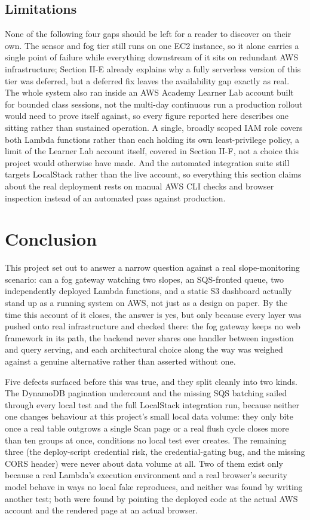 \documentclass[conference]{IEEEtran}
\begin{document}
\subsection{Limitations}
None of the following four gaps should be left for a reader to discover on their own. The sensor and fog tier still runs on one EC2 instance, so it alone carries a single point of failure while everything downstream of it sits on redundant AWS infrastructure; Section II-E already explains why a fully serverless version of this tier was deferred, but a deferred fix leaves the availability gap exactly as real. The whole system also ran inside an AWS Academy Learner Lab account built for bounded class sessions, not the multi-day continuous run a production rollout would need to prove itself against, so every figure reported here describes one sitting rather than sustained operation. A single, broadly scoped IAM role covers both Lambda functions rather than each holding its own least-privilege policy, a limit of the Learner Lab account itself, covered in Section II-F, not a choice this project would otherwise have made. And the automated integration suite still targets LocalStack rather than the live account, so everything this section claims about the real deployment rests on manual AWS CLI checks and browser inspection instead of an automated pass against production.

\section{Conclusion}
This project set out to answer a narrow question against a real slope-monitoring scenario: can a fog gateway watching two slopes, an SQS-fronted queue, two independently deployed Lambda functions, and a static S3 dashboard actually stand up as a running system on AWS, not just as a design on paper. By the time this account of it closes, the answer is yes, but only because every layer was pushed onto real infrastructure and checked there: the fog gateway keeps no web framework in its path, the backend never shares one handler between ingestion and query serving, and each architectural choice along the way was weighed against a genuine alternative rather than asserted without one.

Five defects surfaced before this was true, and they split cleanly into two kinds. The DynamoDB pagination undercount and the missing SQS batching sailed through every local test and the full LocalStack integration run, because neither one changes behaviour at this project's small local data volume: they only bite once a real table outgrows a single Scan page or a real flush cycle closes more than ten groups at once, conditions no local test ever creates. The remaining three (the deploy-script credential risk, the credential-gating bug, and the missing CORS header) were never about data volume at all. Two of them exist only because a real Lambda's execution environment and a real browser's security model behave in ways no local fake reproduces, and neither was found by writing another test; both were found by pointing the deployed code at the actual AWS account and the rendered page at an actual browser.
\end{document}
